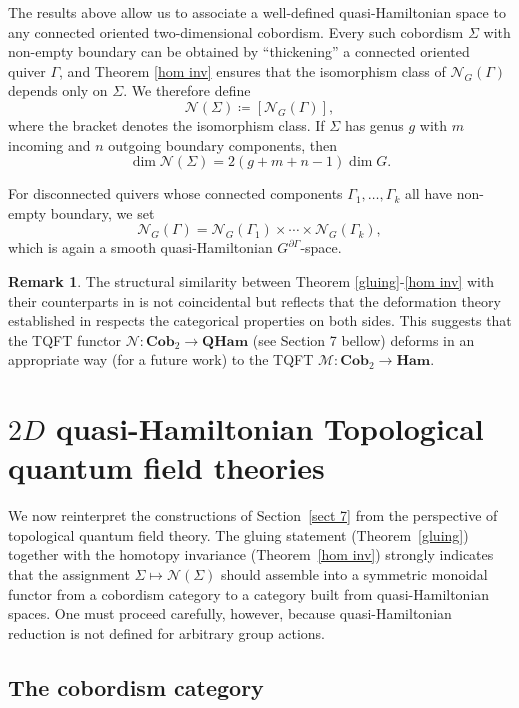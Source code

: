 \documentclass[reqno]{amsart}
\theoremstyle{plain}
\theoremstyle{definition}
\newtheorem{Rem}[Thm]{Remark}
\newcommand{\too}{\longrightarrow}
\newcommand{\M}{\mathcal{M}}
\newcommand{\N}{\mathcal{N}}
\begin{document}
The results above allow us to associate a well-defined quasi-Hamiltonian space to any connected oriented two-dimensional cobordism. Every such cobordism $\Sigma$ with non-empty boundary can be obtained by ``thickening'' a connected oriented quiver $\Gamma$, and Theorem \ref{hom inv} ensures that the isomorphism class of $\N_G(\Gamma)$ depends only on $\Sigma$. We therefore define
\[
\N(\Sigma) \coloneqq [\N_G(\Gamma)],
\]
where the bracket denotes the isomorphism class. If $\Sigma$ has genus $g$ with $m$ incoming and $n$ outgoing boundary components, then
\[
\dim \N(\Sigma) = 2(g + m + n - 1)\dim G.
\]

For disconnected quivers whose connected components $\Gamma_1, \ldots, \Gamma_k$ all have non-empty boundary, we set
\[
\N_G(\Gamma) = \N_G(\Gamma_1) \times \cdots \times \N_G(\Gamma_k),
\]
which is again a smooth quasi-Hamiltonian $G^{\partial\Gamma}$-space.

\begin{Rem}
The structural similarity between Theorem \ref{gluing}-\ref{hom inv} with their counterparts in \cite{maiza2025lax} is not coincidental but reflects that the deformation theory established in \cite{JMM2025deformations} respects the categorical properties on both sides. This suggests that the TQFT functor $\N: \mathbf{Cob}_2 \too \mathbf{QHam}$ (see Section 7 bellow) deforms in an appropriate way (for a future work) to the TQFT $\M: \mathbf{Cob}_2 \too \mathbf{Ham}.$ 
\end{Rem}

\section{$2D$ quasi-Hamiltonian Topological quantum field theories}\label{sect 8}

We now reinterpret the constructions of Section~\ref{sect 7} from the
perspective of topological quantum field theory.  The gluing statement
(Theorem~\ref{gluing}) together with the homotopy invariance
(Theorem~\ref{hom inv}) strongly indicates that the assignment
\(\Sigma \mapsto \N(\Sigma)\) should assemble into a symmetric monoidal
functor from a cobordism category to a category built from
quasi-Hamiltonian spaces.  One must proceed carefully, however, because
quasi-Hamiltonian reduction is not defined for arbitrary group actions.

\subsection{The cobordism category}
\end{document}
